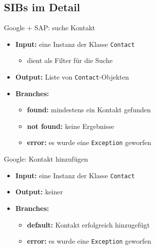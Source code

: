 \subsection*{SIBs im Detail}
\begin{frame}{Google + SAP: suche Kontakt}
\begin{itemize}
	\item \textbf{Input:} eine Instanz der Klasse \texttt{Contact}
		\begin{itemize}
			\item dient als Filter für die Suche
		\end{itemize}
	\item \textbf{Output:} Liste von \texttt{Contact}-Objekten

	\item \textbf{Branches:}
		\begin{itemize}
			\item \textbf{found:} mindestens ein Kontakt gefunden
			\item \textbf{not found:} keine Ergebnisse
			\item \textbf{error:} es wurde eine \texttt{Exception} geworfen
		\end{itemize}

\end{itemize}
\end{frame}


\begin{frame}{Google: Kontakt hinzufügen}
\begin{itemize}
	\item \textbf{Input:} eine Instanz der Klasse \texttt{Contact}

	\item \textbf{Output:} keiner

	\item \textbf{Branches:}
		\begin{itemize}
			\item \textbf{default:} Kontakt erfolgreich hinzugefügt
			\item \textbf{error:} es wurde eine \texttt{Exception} geworfen
		\end{itemize}

\end{itemize}
\end{frame}


